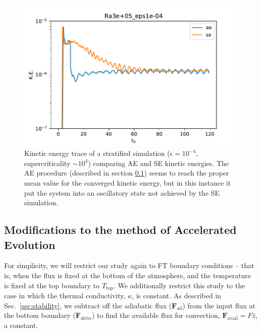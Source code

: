 \begin{figure}[t!]
    \includegraphics[width=\textwidth]{figs/unpublished/gabo_ae.pdf}
    \caption[Timeseries of kinetic energy in stratified AE vs.~SE.]{
	Kinetic energy trace of a stratified simulation ($\epsilon = 10^{-4}$, supercriticality $\sim 10^4$) comparing AE and SE kinetic energies.
	The AE procedure (described in section \ref{sec:ae}) seems to reach the proper mean value for the converged kinetic energy, but in this instance it put the system into an oscillatory state not achieved by the SE simulation.
    \label{fig:gabo_ae} }
\end{figure}




\subsection{Modifications to the method of Accelerated Evolution}
\label{sec:ae}
For simplicity, we will restrict our study again to FT boundary conditions -- that is, when the flux is fixed at the bottom of the atmosphere, and the temperature is fixed at the top boundary to $T_{\text{top}}$.
We additionally restrict this study to the case in which the thermal conductivity, $\kappa$, is constant.
As described in Sec.~\ref{sec:stability}, we subtract off the adiabatic flux ($\bm{F}_{\text{ad}}$) from the input flux at the bottom boundary ($\bm{F}_{\text{drive}}$) to find the available flux for convection, $\bm{F}_{\text{avail}} = F \hat{z}$, a constant.

